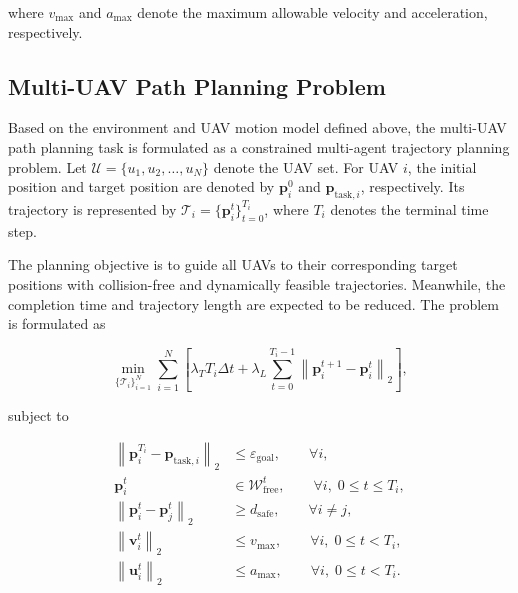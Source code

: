 \noindent
where $v_{\max}$ and $a_{\max}$ denote the maximum allowable velocity and acceleration, respectively.



\subsection{Multi-UAV Path Planning Problem}

Based on the environment and UAV motion model defined above, the multi-UAV path planning task is formulated as a constrained multi-agent trajectory planning problem.
Let $\mathcal{U}=\{u_1,u_2,\ldots,u_N\}$ denote the UAV set.
For UAV $i$, the initial position and target position are denoted by $\mathbf{p}_i^0$ and $\mathbf{p}_{\mathrm{task},i}$, respectively.
Its trajectory is represented by $\mathcal{T}_i=\{\mathbf{p}_i^t\}_{t=0}^{T_i}$, where $T_i$ denotes the terminal time step.

The planning objective is to guide all UAVs to their corresponding target positions with collision-free and dynamically feasible trajectories.
Meanwhile, the completion time and trajectory length are expected to be reduced.
The problem is formulated as

\begin{equation}
    \label{eq:multi_uav_planning_objective}
    \min_{\{\mathcal{T}_i\}_{i=1}^{N}}
    \sum_{i=1}^{N}
    \left[
        \lambda_T T_i \Delta t
        +
        \lambda_L
        \sum_{t=0}^{T_i-1}
        \left\|
        \mathbf{p}_i^{t+1}
        -
        \mathbf{p}_i^t
        \right\|_2
    \right],
\end{equation}

subject to

\begin{equation}
    \label{eq:multi_uav_planning_constraints}
    \begin{aligned}
        \left\|
        \mathbf{p}_i^{T_i}
        -
        \mathbf{p}_{\mathrm{task},i}
        \right\|_2
        &\leq
        \varepsilon_{\mathrm{goal}},
        \qquad \forall i,
        \\[2mm]
        \mathbf{p}_i^t
        &\in
        \mathcal{W}_{\mathrm{free}}^t,
        \qquad
        \forall i,\; 0\leq t\leq T_i,
        \\[2mm]
        \left\|
        \mathbf{p}_i^t
        -
        \mathbf{p}_j^t
        \right\|_2
        &\geq
        d_{\mathrm{safe}},
        \qquad
        \forall i\neq j,
        \\[2mm]
        \left\|
        \mathbf{v}_i^t
        \right\|_2
        &\leq
        v_{\max},
        \qquad
        \forall i,\; 0\leq t<T_i,
        \\[2mm]
        \left\|
        \mathbf{u}_i^t
        \right\|_2
        &\leq
        a_{\max},
        \qquad
        \forall i,\; 0\leq t<T_i.
    \end{aligned}
\end{equation}

